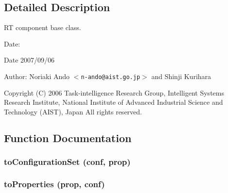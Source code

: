 \subsection{Detailed Description}
RT component base class. 

\begin{Desc}
\item[Date:]\begin{Desc}
\item[Date]2007/09/06\end{Desc}
\end{Desc}
\begin{Desc}
\item[Author:]Noriaki Ando $<${\tt n-ando@aist.go.jp}$>$ and Shinji Kurihara\end{Desc}
Copyright (C) 2006 Task-intelligence Research Group, Intelligent Systems Research Institute, National Institute of Advanced Industrial Science and Technology (AIST), Japan All rights reserved.

\subsection{Function Documentation}
\subsubsection{\setlength{\rightskip}{0pt plus 5cm}to\-Configuration\-Set (conf, prop)}\label{SdoConfiguration_8py_a1}


\subsubsection{\setlength{\rightskip}{0pt plus 5cm}to\-Properties (prop, conf)}\label{SdoConfiguration_8py_a0}


